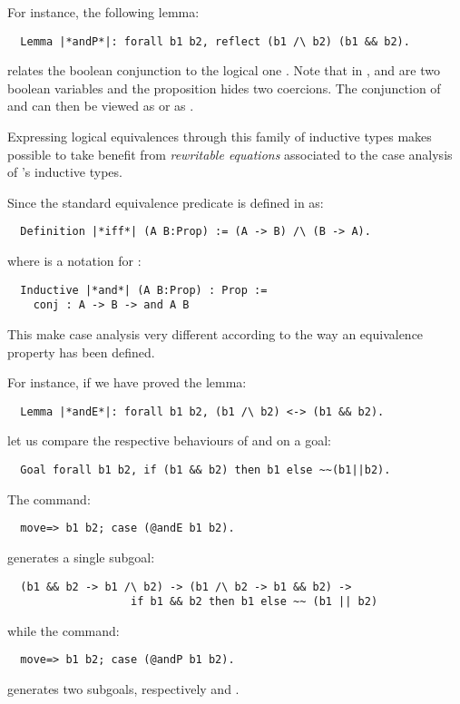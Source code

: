 For instance, the following lemma:
\begin{lstlisting}
  Lemma |*andP*|: forall b1 b2, reflect (b1 /\ b2) (b1 && b2).
\end{lstlisting}
relates the boolean conjunction \C{&&} to
the logical one \C{/\\}.
Note that in ,  and  are two boolean variables and
the proposition  hides two coercions.
The conjunction of  and  can then be viewed
as   or as .


Expressing logical equivalences through this family of inductive types
makes possible to take benefit from \emph{rewritable equations}
associated to the case analysis of \Coq{}'s inductive types.

Since the standard equivalence predicate is defined in \Coq{} as:
\begin{lstlisting}
  Definition |*iff*| (A B:Prop) := (A -> B) /\ (B -> A).
\end{lstlisting}
where \C{/\\} is a notation for :
\begin{lstlisting}
  Inductive |*and*| (A B:Prop) : Prop :=
    conj : A -> B -> and A B
\end{lstlisting}

This make case analysis very different according to the way an
equivalence property has been defined.


For instance, if we have proved the lemma:
\begin{lstlisting}
  Lemma |*andE*|: forall b1 b2, (b1 /\ b2) <-> (b1 && b2).
\end{lstlisting}
let us compare the respective behaviours of  and  on a
goal:
\begin{lstlisting}
  Goal forall b1 b2, if (b1 && b2) then b1 else ~~(b1||b2).
\end{lstlisting}

The command:
\begin{lstlisting}
  move=> b1 b2; case (@andE b1 b2).
\end{lstlisting}
generates a single subgoal:
\begin{lstlisting}
  (b1 && b2 -> b1 /\ b2) -> (b1 /\ b2 -> b1 && b2) ->
                   if b1 && b2 then b1 else ~~ (b1 || b2)
\end{lstlisting}

while the command:
\begin{lstlisting}
  move=> b1 b2; case (@andP b1 b2).
\end{lstlisting}
generates two subgoals, respectively  and
.



